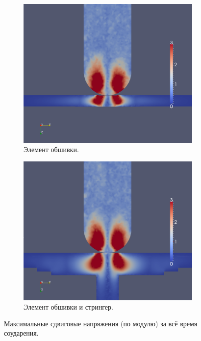 \begin{figure}[h]
\begin{subfigure}[b]{0.5\textwidth}
\centering
\includegraphics[width=\textwidth]{png/pkm-experiment/wing-only/shear.png}
\caption{Элемент обшивки.}
\end{subfigure}
\begin{subfigure}[b]{0.5\textwidth}
\centering
\includegraphics[width=\textwidth]{png/pkm-experiment/wing-stringer/shear.png}
\caption{Элемент обшивки и стрингер.}
\end{subfigure}
\caption{Максимальные сдвиговые напряжения (по модулю) за всё время соударения.}
\label{pic:pkm_experiment_shear}
\end{figure}

